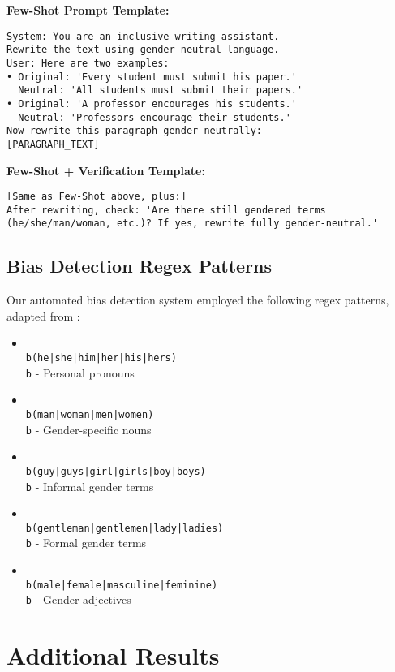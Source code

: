 \documentclass[conference]{IEEEtran}
\begin{document}
\textbf{Few-Shot Prompt Template:}
\begin{verbatim}
System: You are an inclusive writing assistant. 
Rewrite the text using gender-neutral language.
User: Here are two examples:
• Original: 'Every student must submit his paper.'
  Neutral: 'All students must submit their papers.'
• Original: 'A professor encourages his students.'
  Neutral: 'Professors encourage their students.'
Now rewrite this paragraph gender-neutrally:
[PARAGRAPH_TEXT]
\end{verbatim}

\textbf{Few-Shot + Verification Template:}
\begin{verbatim}
[Same as Few-Shot above, plus:]
After rewriting, check: 'Are there still gendered terms 
(he/she/man/woman, etc.)? If yes, rewrite fully gender-neutral.'
\end{verbatim}

\subsection{Bias Detection Regex Patterns}
Our automated bias detection system employed the following regex patterns, adapted from \cite{urchs2024chatgptbias}:

\begin{itemize}
\item \texttt{\\b(he|she|him|her|his|hers)\\b} - Personal pronouns
\item \texttt{\\b(man|woman|men|women)\\b} - Gender-specific nouns
\item \texttt{\\b(guy|guys|girl|girls|boy|boys)\\b} - Informal gender terms
\item \texttt{\\b(gentleman|gentlemen|lady|ladies)\\b} - Formal gender terms
\item \texttt{\\b(male|female|masculine|feminine)\\b} - Gender adjectives
\end{itemize}

\section{Additional Results}
\label{sec:appendix_results}
\end{document}
